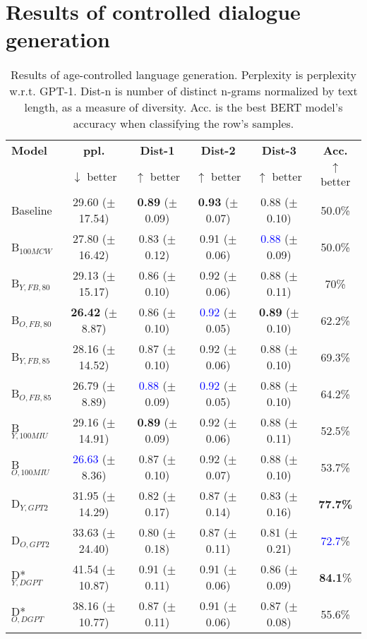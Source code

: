 \newpage
\section{Results of controlled dialogue generation}

\begin{table*}[h]
    \centering
    \begin{tabular}{l c c c c c}
    \toprule
    \textbf{Model} & \textbf{ppl.} & \textbf{Dist-1} & \textbf{Dist-2} & \textbf{Dist-3} & \textbf{Acc.}\\
     & $\downarrow$ better & $\uparrow$ better & $\uparrow$ better & $\uparrow$ better & $\uparrow$ better\\
    \midrule
    \midrule
    Baseline & 29.60 ($\pm$17.54) & \textbf{0.89} ($\pm$0.09) & \textbf{0.93} ($\pm$0.07) & 0.88 ($\pm$0.10) & 50.0\%\\
    \midrule
    B$_{100MCW}$ & 27.80 ($\pm$16.42) & 0.83 ($\pm$0.12) & 0.91 ($\pm$0.06) & \textcolor{blue}{0.88} ($\pm$0.09) & 50.0\%\\
    B$_{Y, FB, 80}$ & 29.13 ($\pm$15.17) & 0.86 ($\pm$0.10) & 0.92 ($\pm$0.06) & 0.88 ($\pm$0.11) & 70\%\\
    B$_{O, FB, 80}$ & \textbf{26.42} ($\pm$8.87) & 0.86 ($\pm$0.10) & \textcolor{blue}{0.92} ($\pm$0.05) & \textbf{0.89} ($\pm$0.10) & 62.2\%\\
    B$_{Y, FB, 85}$ & 28.16 ($\pm$14.52) & 0.87 ($\pm$0.10) & 0.92 ($\pm$0.06) & 0.88 ($\pm$0.10) & 69.3\%\\
    B$_{O, FB, 85}$ & 26.79 ($\pm$8.89) & \textcolor{blue}{0.88} ($\pm$0.09) & \textcolor{blue}{0.92} ($\pm$0.05) & 0.88 ($\pm$0.10) & 64.2\%\\
    B$_{Y, 100MIU}$ & 29.16 ($\pm$14.91) & \textbf{0.89} ($\pm$0.09) & 0.92 ($\pm$0.06) & 0.88 ($\pm$0.11) & 52.5\%\\
    B$_{O, 100MIU}$ & \textcolor{blue}{26.63} ($\pm$8.36) & 0.87 ($\pm$0.10) & 0.92 ($\pm$0.07) & 0.88 ($\pm$0.10) & 53.7\%\\
    \midrule
    D$_{Y, GPT2}$ & 31.95 ($\pm$14.29) & 0.82 ($\pm$0.17) & 0.87 ($\pm$0.14) & 0.83 ($\pm$0.16) & \textbf{77.7\%}\\
    D$_{O, GPT2}$ & 33.63 ($\pm$24.40) & 0.80 ($\pm$0.18) & 0.87 ($\pm$0.11) & 0.81 ($\pm$0.21) & \textcolor{blue}{72.7}\%\\
    D*$_{Y, DGPT}$ & 41.54 ($\pm$10.87) & 0.91 ($\pm$0.11) & 0.91 ($\pm$0.06) & 0.86 ($\pm$0.09) & \textbf{84.1}\%\\
    D*$_{O, DGPT}$ & 38.16 ($\pm$10.77) & 0.87 ($\pm$0.11) & 0.91 ($\pm$0.06) & 0.87 ($\pm$0.08) & 55.6\%\\
    \bottomrule
    \end{tabular}
    \caption{ Results of age-controlled language generation. Perplexity is perplexity w.r.t. GPT-1. Dist-n is number of distinct n-grams normalized by text length, as a measure of diversity. Acc. is the best BERT model's accuracy when classifying the row's samples.}
    \label{tab:ctg_results_ws}
\end{table*}



